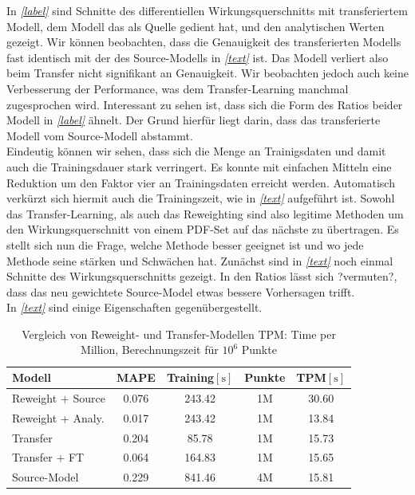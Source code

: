 In \textit{\autoref{label}} sind Schnitte des differentiellen Wirkungsquerschnitts mit transferiertem Modell, dem Modell das als Quelle gedient hat, und den analytischen Werten gezeigt. Wir können beobachten, dass die Genauigkeit des transferierten Modells fast identisch mit der des Source-Modells in \textit{\autoref{text}} ist. Das Modell verliert also beim Transfer nicht signifikant an Genauigkeit. Wir beobachten jedoch auch keine Verbesserung der Performance, was dem Transfer-Learning manchmal zugesprochen wird. Interessant zu sehen ist, dass sich die Form des Ratios beider Modell in \textit{\autoref{label}} ähnelt. Der Grund hierfür liegt darin, dass das transferierte Modell vom Source-Modell abstammt.\\
Eindeutig können wir sehen, dass sich die Menge an Trainigsdaten und damit auch die Trainingsdauer stark verringert. Es konnte mit einfachen Mitteln eine Reduktion um den Faktor vier an Trainingsdaten erreicht werden. Automatisch verkürzt sich hiermit auch die Trainingszeit, wie in \textit{\autoref{text}} aufgeführt ist. 
Sowohl das Transfer-Learning, als auch das Reweighting sind also legitime Methoden um den Wirkungsquerschnitt von einem PDF-Set auf das nächste zu übertragen. Es stellt sich nun die Frage, welche Methode besser geeignet ist und wo jede Methode seine stärken und Schwächen hat. Zunächst sind in \textit{\autoref{text}} noch einmal Schnitte des Wirkungsquerschnitts gezeigt. In den Ratios lässt sich ?vermuten?, dass das neu gewichtete Source-Model etwas bessere Vorhersagen trifft. \\
\newline
In \textit{\autoref{text}} sind einige Eigenschaften gegenübergestellt.
\begin{table} %
	\centering
	\begin{tabular}{|l|c|c|c|c|}
		\hline
		Modell & MAPE & Training$[\text{s}]$ & Punkte & TPM$[\text{s}]$ \\
		\hline
		Reweight + Source & 0.076 & 243.42 & 1M & 30.60 \\
		Reweight + Analy. &  0.017 & 243.42 & 1M & 13.84 \\
		Transfer & 0.204 & 85.78 & 1M & 15.73\\
		Transfer + FT & 0.064 & 164.83 & 1M & 15.65 \\
		Source-Model & 0.229 & 841.46 & 4M & 15.81\\
		\hline
	\end{tabular}
	\caption{Vergleich von Reweight- und Transfer-Modellen \newline TPM: Time per Million, Berechnungszeit für $10^{6}$ Punkte}
\end{table}
